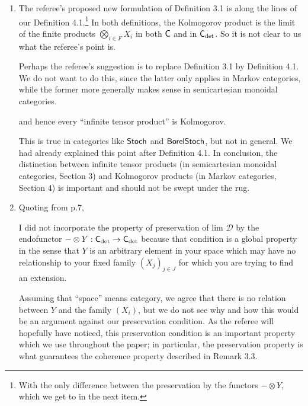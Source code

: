 \documentclass[11pt]{article}
\begin{document}
\begin{enumerate}[resume,label=(\alph*).]
	\item The referee's proposed new formulation of Definition 3.1 is along the lines of our Definition 4.1.\footnote{With the only difference between the preservation by the functors $-\otimes Y$, which we get to in the next item.} In both definitions, the Kolmogorov product is the limit of the finite products $\bigotimes_{i \in F} X_i$ in both $\mathsf{C}$ and in $\mathsf{C}_{\det}$. So it is not clear to us what the referee's point is. 

		Perhaps the referee's suggestion is to replace Definition 3.1 by Definition 4.1. We do not want to do this, since the latter only applies in Markov categories, while the former more generally makes sense in semicartesian monoidal categories.
		\begin{displayquote}
			and hence every ``infinite tensor product'' is Kolmogorov.
		\end{displayquote}
		This is true in categories like $\operatorname{\mathsf{Stoch}}$ and $\operatorname{\mathsf{BorelStoch}}$, but not in general. We had already explained this point after Definition 4.1. In conclusion, the distinction between infinite tensor products (in semicartesian monoidal categories, Section 3) and Kolmogorov products (in Markov categories, Section 4) is important and should not be swept under the rug.
	\item Quoting from p.7,
		\begin{displayquote}
			I did not incorporate the property of preservation of lim $\mathcal{D}$ by the endofunctor
			$-\otimes Y : \mathsf{C}_{\det} \to \mathsf{C}_{\det}$ because that condition is a global property in the sense
		that $Y$ is an arbitrary element in your space which may have no relationship
		to your fixed family $(X_j)_{j\in J}$ for which you are trying to find an extension.
		\end{displayquote}
		Assuming that ``space'' means category, we agree that there is no relation between $Y$ and the family $(X_i)$, but we do not see why and how this would be an argument against our preservation condition. As the referee will hopefully have noticed, this preservation condition is an important property which we use throughout the paper; in particular, the preservation property is what guarantees the coherence property described in Remark 3.3.


\end{enumerate}
\end{document}
